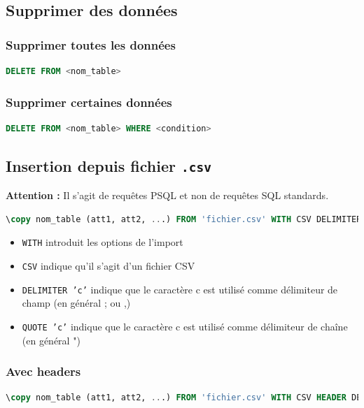 \subsection{Supprimer des données}
\subsubsection{Supprimer toutes les données}
\begin{lstlisting}[language=SQL]
DELETE FROM <nom_table>
\end{lstlisting}

\subsubsection{Supprimer certaines données}
\begin{lstlisting}[language=SQL]
DELETE FROM <nom_table> WHERE <condition>
\end{lstlisting}

\subsection{Insertion depuis fichier \texttt{.csv}}
\textbf{Attention :} Il s'agit de requêtes PSQL et non de requêtes SQL standards.
\begin{lstlisting}[language=SQL]
 \copy nom_table (att1, att2, ...) FROM 'fichier.csv' WITH CSV DELIMITER ';' QUOTE '"'
\end{lstlisting}
\begin{itemize}
    \item \texttt{WITH} introduit les options de l'import
    \item \texttt{CSV} indique qu'il s'agit d'un fichier CSV
    \item \texttt{DELIMITER 'c'} indique que le caractère c est utilisé comme délimiteur de champ (en général ; ou ,)
    \item  \texttt{QUOTE 'c'} indique que le caractère c est utilisé comme délimiteur de chaîne (en général ")
\end{itemize}

\subsubsection{Avec headers}
\begin{lstlisting}[language=SQL]
 \copy nom_table (att1, att2, ...) FROM 'fichier.csv' WITH CSV HEADER DELIMITER ';' QUOTE '"'
\end{lstlisting}

